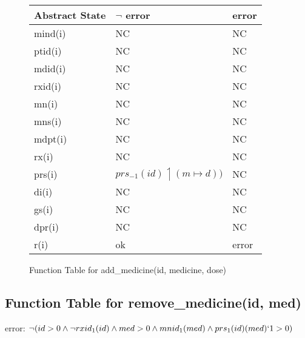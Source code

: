 \begin{figure}[h]
\begin{center}
\begin{tabular}{|l|l|l|}
\hline
Abstract State & $\neg$ error & error \\ \hline
mind(i)        &   NC        & NC    \\ \hline
ptid(i)        &     NC      & NC    \\ \hline
mdid(i)        &   NC        & NC    \\ \hline
rxid(i)        &     NC      & NC    \\ \hline
mn(i)          &    NC       & NC    \\ \hline
mns(i)         &   NC        & NC    \\ \hline
mdpt(i)        &   NC        & NC    \\ \hline
rx(i)          &      NC     & NC    \\ \hline
prs(i)         &     $prs_{-1}(id) \upharpoonleft (m \mapsto d))$      & NC    \\ \hline
di(i)          &      NC     & NC    \\ \hline
gs(i)          &     NC      & NC    \\ \hline
dpr(i)         &     NC      & NC    \\ \hline
r(i)           & ok        & error \\ \hline
\end{tabular}
\caption{Function Table for add\_medicine(id, medicine, dose)}
\label{ft-am}
\end{center}
\end{figure}

\newpage

\subsection{Function Table for remove\_medicine(id, med)}

error: $\neg (id > 0 \wedge \neg rxid_{1}(id) \wedge med > 0  \wedge mnid_{1}(med) \wedge prs_{1}(id)(med)`1 > 0)$


